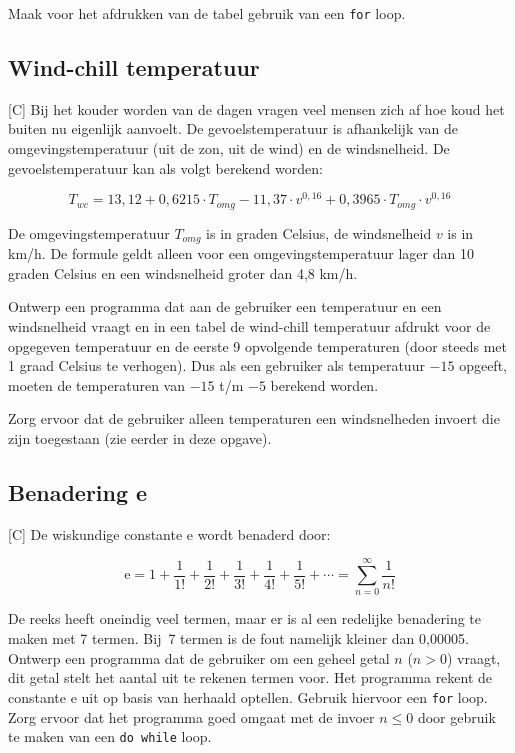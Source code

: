 \documentclass[a4paper,10pt,fleqn,twoside]{article}
\begin{document}
Maak voor het afdrukken van de tabel gebruik van een \lstinline|for| loop.

\subsection{Wind-chill temperatuur}[C]
Bij het kouder worden van de dagen vragen veel mensen zich af hoe koud het buiten nu eigenlijk aanvoelt. De gevoelstemperatuur is afhankelijk van de omgevingstemperatuur (uit de zon, uit de wind) en de windsnelheid. De gevoelstemperatuur kan als volgt berekend worden:

\begin{equation*}
T_{wc}=13,12 + 0,6215\cdot T_{omg} - 11,37\cdot v^{0,16} + 0,3965\cdot T_{omg}\cdot v^{0,16}
\end{equation*}

De omgevingstemperatuur $T_{omg}$ is in graden Celsius, de windsnelheid $v$ is in km/h. De formule geldt alleen voor een omgevingstemperatuur lager dan 10 graden Celsius en een windsnelheid groter dan 4,8 km/h.

Ontwerp een programma dat aan de gebruiker een temperatuur en een windsnelheid vraagt en in een tabel de wind-chill temperatuur afdrukt voor de opgegeven temperatuur en de eerste 9 opvolgende temperaturen (door steeds met 1 graad Celsius te verhogen). Dus als een gebruiker als temperatuur $-15$ opgeeft, moeten de temperaturen van $-15$ t/m $-5$ berekend worden.

Zorg ervoor dat de gebruiker alleen temperaturen een windsnelheden invoert die zijn toegestaan (zie eerder in deze opgave).

\subsection{Benadering e}[C]
De wiskundige constante e wordt benaderd door:

\begin{equation*}
\mathrm{e} = 1 + \dfrac{1}{1!} + \dfrac{1}{2!} + \dfrac{1}{3!} + \dfrac{1}{4!} + \dfrac{1}{5!} + \cdots = \sum_{n=0}^{\infty} \dfrac{1}{n!}
\end{equation*}

De reeks heeft oneindig veel termen, maar er is al een redelijke benadering te maken met 7 termen. Bij~7 termen is de fout namelijk kleiner dan 0,00005. Ontwerp een programma dat de gebruiker om een geheel getal $n$ ($n > 0$) vraagt, dit getal stelt het aantal uit te rekenen termen voor. Het programma rekent de constante e uit op basis van herhaald optellen. Gebruik hiervoor een \lstinline|for| loop. Zorg ervoor dat het programma goed omgaat met de invoer $n \leq 0$ door gebruik te maken van een \lstinline|do while| loop.
\end{document}
